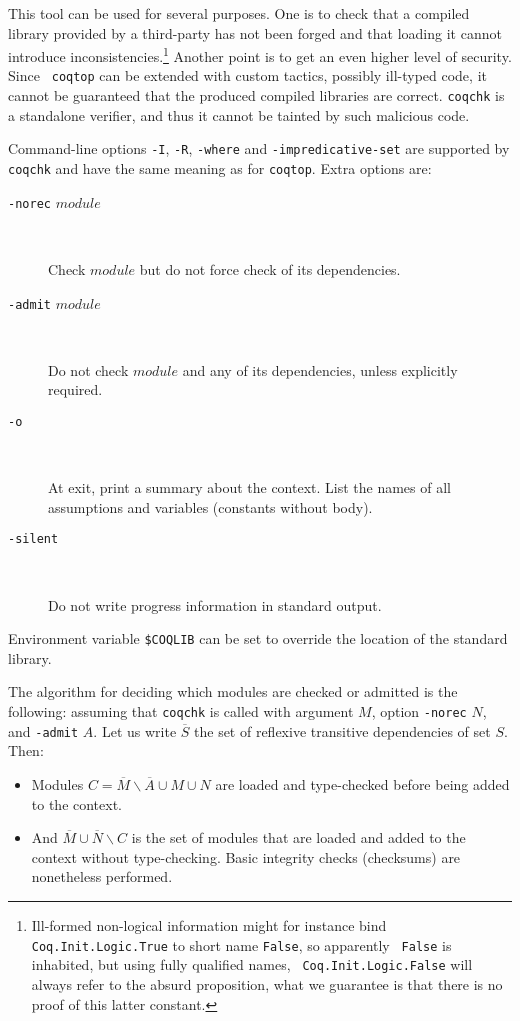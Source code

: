 This tool can be used for several purposes. One is to check that a
compiled library provided by a third-party has not been forged and
that loading it cannot introduce inconsistencies.\footnote{Ill-formed
  non-logical information might for instance bind {\tt
    Coq.Init.Logic.True} to short name {\tt False}, so apparently {\tt
    False} is inhabited, but using fully qualified names, {\tt
    Coq.Init.Logic.False} will always refer to the absurd proposition,
  what we guarantee is that there is no proof of this latter
  constant.}
Another point is to get an even higher level of security. Since {\tt
  coqtop} can be extended with custom tactics, possibly ill-typed
code, it cannot be guaranteed that the produced compiled libraries are
correct. {\tt coqchk} is a standalone verifier, and thus it cannot be
tainted by such malicious code.

Command-line options {\tt -I}, {\tt -R}, {\tt -where} and
{\tt -impredicative-set} are supported by {\tt coqchk} and have the
same meaning as for {\tt coqtop}. Extra options are:
\begin{description}
\item[{\tt -norec} $module$]\ 

  Check $module$ but do not force check of its dependencies.
\item[{\tt -admit} $module$] \

  Do not check $module$ and any of its dependencies, unless
  explicitly required.
\item[{\tt -o}]\ 

  At exit, print a summary about the context. List the names of all
  assumptions and variables (constants without body).
\item[{\tt -silent}]\ 

  Do not write progress information in standard output.
\end{description}

Environment variable \verb:$COQLIB: can be set to override the
location of the standard library.

The algorithm for deciding which modules are checked or admitted is
the following: assuming that {\tt coqchk} is called with argument $M$,
option {\tt -norec} $N$, and {\tt -admit} $A$. Let us write
$\overline{S}$ the set of reflexive transitive dependencies of set
$S$. Then:
\begin{itemize}
\item Modules $C=\overline{M}\backslash\overline{A}\cup M\cup N$ are
  loaded and type-checked before being added to the context.
\item And $\overline{M}\cup\overline{N}\backslash C$ is the set of
  modules that are loaded and added to the context without
  type-checking. Basic integrity checks (checksums) are nonetheless
  performed.
\end{itemize}

